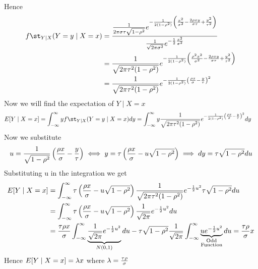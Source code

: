 \documentclass[a4paper, 11pt]{article}
\begin{document}
{Hence \begin{align*}
	f\st_{Y\mid X}(Y=y\mid X=x) & =\frac{\frac{1}{2\pi \sigma\tau\sqrt{1-\rho^2}}e^{-\frac1{2(1-\rho^2)}\lt(\frac{x^2}{\sigma^2}-\frac{2\rho xy}{\sigma\tau}+\frac{y^2}{\tau^2}\rt)}}{\frac{1}{\sqrt{2\pi\sigma^2}}e^{-\frac12 \frac{x^2}{\sigma^2}}} \\
	                            & =\frac{1}{\sqrt{2\pi\tau^2(1-\rho^2)}}e^{-\frac1{2(1-\rho^2)}\lt(\frac{\rho^2x^2}{\sigma^2}-\frac{2\rho xy}{\sigma\tau}+\frac{y^2}{\tau^2}\rt)}                                                                     \\
	                            & = \frac{1}{\sqrt{2\pi\tau^2(1-\rho^2)}}e^{-\frac1{2(1-\rho^2)}\lt(\frac{\rho x}{\sigma}-\frac{y}{\tau}\rt)^2}
\end{align*}Now we will find the expectation of $Y\mid X=x$ \begin{align*}
	E[Y\mid X=x] & = \int_{-\infty}^{\infty}yf\st_{Y\mid X}(Y=y\mid X=x)dy =\int_{-\infty}^{\infty}y\frac{1}{\sqrt{2\pi\tau^2(1-\rho^2)}}e^{-\frac1{2(1-\rho^2)}\lt(\frac{\rho x}{\sigma}-\frac{y}{\tau}\rt)^2}dy
\end{align*}Now we substitute $$u=\frac{1}{\sqrt{1-\rho^2}}\left(\frac{\rho x}{\sigma}-\frac{y}{\tau}\right)\iff y =\tau\left(\frac{\rho x}{\sigma}- u\sqrt{1-\rho^2} \right)\implies dy = \tau\sqrt{1-\rho^2}du$$Substituting u in the integration we get \begin{align*}
	E[Y\mid X=x] & = \int_{-\infty}^{\infty}\tau\left(\frac{\rho x}{\sigma}- u\sqrt{1-\rho^2} \right)\frac{1}{\sqrt{2\pi\tau^2(1-\rho^2)}}e^{-\frac12u^2}\tau\sqrt{1-\rho^2}du                                                                            \\
	             & = \int_{-\infty}^{\infty}\tau\left(\frac{\rho x}{\sigma}- u\sqrt{1-\rho^2} \right)\frac{1}{\sqrt{2\pi}}{e^{-\frac12u^2}}du                                                                                                             \\
	             & =\frac{\tau\rho x}{\sigma}\int_{-\infty}^{\infty}\underbrace{\frac{1}{\sqrt{2\pi}}e^{-\frac12u^2}}_{N(0,1)}du- \tau\sqrt{1-\rho^2}\frac{1}{\sqrt{2\pi}}\int_{-\infty}^{\infty}\underbrace{ue^{-\frac12u^2}}_{\substack{\text{Odd} \\ \text{Function}}}du= \frac{\tau\rho }{\sigma}x
\end{align*} Hence $E[Y\mid X=x]=\lambda x$ where $\lambda=\frac{\tau\rho }{\sigma}$
}
\end{document}
